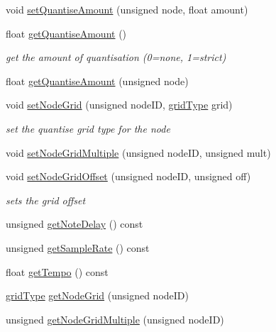 \begin{DoxyCompactItemize}
void \hyperlink{classQuantisedEventQueue_aee5e2fa3c8fe5cf7ab23d2da94c97fb2}{set\+Quantise\+Amount} (unsigned node, float amount)
\item 
float \hyperlink{classQuantisedEventQueue_aaef3b89d1b622c3a2b3a96862d55f12d}{get\+Quantise\+Amount} ()
\begin{DoxyCompactList}\small\item\em get the amount of quantisation (0=none, 1=strict) \end{DoxyCompactList}\item 
float \hyperlink{classQuantisedEventQueue_a009ee8815cadef590721c7c20edf57d6}{get\+Quantise\+Amount} (unsigned node)
\item 
void \hyperlink{classQuantisedEventQueue_a38904e3d52d5ff1c12a341cb8c1d7336}{set\+Node\+Grid} (unsigned node\+ID, \hyperlink{classQuantisedEventQueue_ae186d50bd503038452edbbdd0c7c259e}{grid\+Type} grid)
\begin{DoxyCompactList}\small\item\em set the quantise grid type for the node \end{DoxyCompactList}\item 
void \hyperlink{classQuantisedEventQueue_ac89afce9a33fbec4bfc289fee3c1a704}{set\+Node\+Grid\+Multiple} (unsigned node\+ID, unsigned mult)
\item 
void \hyperlink{classQuantisedEventQueue_a624f66343d287393ee644ce75e0e276a}{set\+Node\+Grid\+Offset} (unsigned node\+ID, unsigned off)
\begin{DoxyCompactList}\small\item\em sets the grid offset \end{DoxyCompactList}\item 
unsigned \hyperlink{classQuantisedEventQueue_afce26b08746b69c74472e1d73ea5afc4}{get\+Note\+Delay} () const 
\item 
unsigned \hyperlink{classQuantisedEventQueue_afb80f201159a218f54a8746aad366b92}{get\+Sample\+Rate} () const 
\item 
float \hyperlink{classQuantisedEventQueue_a2a74b457e6229a95f9cfd7ca3cc0527a}{get\+Tempo} () const 
\item 
\hyperlink{classQuantisedEventQueue_ae186d50bd503038452edbbdd0c7c259e}{grid\+Type} \hyperlink{classQuantisedEventQueue_a9911be9983ea940de9e170a82dd9cd54}{get\+Node\+Grid} (unsigned node\+ID)
\item 
unsigned \hyperlink{classQuantisedEventQueue_a405616c44942ca195981be37f7d7a81d}{get\+Node\+Grid\+Multiple} (unsigned node\+ID)
\item 

\end{DoxyCompactItemize}
